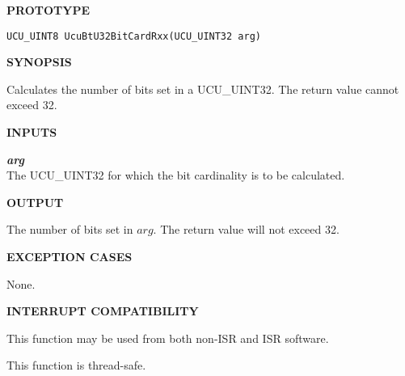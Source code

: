 \noindent\textbf{PROTOTYPE}
\begin {list}{}{\setlength{\leftmargin}{0.25in}\setlength{\topsep}{0.0in}}
\item
\begin{verbatim}
UCU_UINT8 UcuBtU32BitCardRxx(UCU_UINT32 arg)
\end{verbatim}
\end{list}
\vspace{2.8ex}

\noindent\textbf{SYNOPSIS}
\begin{list}{}{\setlength{\leftmargin}{0.25in}\setlength{\topsep}{0.0in}}
\item Calculates the number of bits set in a UCU\_UINT32.  The return value cannot
      exceed 32.
\end{list}
\vspace{2.8ex}

\noindent\textbf{INPUTS}
\begin{list}{}{\setlength{\leftmargin}{0.5in}\setlength{\itemindent}{-0.25in}\setlength{\topsep}{0.0in}\setlength{\partopsep}{0.0in}}
\item \emph{\textbf{arg}}\\
      The UCU\_UINT32 for which the bit cardinality is to be calculated.
\end{list}
\vspace{2.8ex}

\noindent\textbf{OUTPUT}
\begin{list}{}{\setlength{\leftmargin}{0.25in}\setlength{\topsep}{0.0in}}
\item  The number of bits set in $arg$.  The return value will not exceed 32.
\end{list}
\vspace{2.8ex}

\noindent\textbf{EXCEPTION CASES}
\begin{list}{}{\setlength{\leftmargin}{0.25in}\setlength{\topsep}{0.0in}}
\item None.
\end{list}
\vspace{2.8ex}

\noindent\textbf{INTERRUPT COMPATIBILITY}
\begin{list}{}{\setlength{\leftmargin}{0.25in}\setlength{\topsep}{0.0in}}
\item This function may be used from both non-ISR and ISR software.
\item This function is thread-safe.
\end{list}
\vspace{2.8ex}


